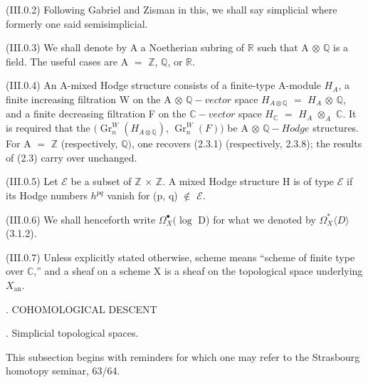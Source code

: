 \documentclass[11pt,twoside]{article}
\begin{document}
(III.0.2) Following Gabriel and Zisman in this, we shall say simplicial where formerly one said semisimplicial.\par
\par\medskip
(III.0.3) We shall denote by A a Noetherian subring of \(\mathbb{R}\) such that A \(\otimes \) \(\mathbb{Q}\) is a field. The useful cases are A \(=\) \(\mathbb{Z}\), \(\mathbb{Q}\), or \(\mathbb{R}\).\par
\par\medskip
(III.0.4) An A-mixed Hodge structure consists of a finite-type A-module \(H_{A}\), a finite increasing filtration W on the A \(\otimes \) \(\mathbb{Q}-vector\) space \(H_{A\otimes \mathbb{Q}}\) \(=\) \(H_{A}\) \(\otimes \) \(\mathbb{Q}\), and a finite decreasing filtration F on the \(\mathbb{C}-vector\) space \(H_{\mathbb{C}}\) \(=\) \(H_{A}\) \(\otimes _{A}\) \(\mathbb{C}\). It is required that the \((\operatorname{Gr}_{n}^{W}(H_{A\otimes \mathbb{Q}})\), \(\operatorname{Gr}_{n}^{W}(F))\) be A \(\otimes \) \(\mathbb{Q}-Hodge\) structures. For A \(=\) \(\mathbb{Z}\) (respectively, \(\mathbb{Q})\), one recovers (2.3.1) (respectively, 2.3.8); the results of (2.3) carry over unchanged.\par
\par\medskip
(III.0.5) Let \(\mathcal{E}\) be a subset of \(\mathbb{Z}\) \(\times \) \(\mathbb{Z}\). A mixed Hodge structure H is of type \(\mathcal{E}\) if its Hodge numbers \(h^{pq}\) vanish for (p, q) \(\notin \) \(\mathcal{E}\).\par
\par\medskip
(III.0.6) We shall henceforth write \(\Omega _{X}^{\bullet }(\operatorname{log}\) D) for what we denoted by \(\Omega _{X}^{\ast }⟨D⟩\) (3.1.2).\par
\par\medskip
(III.0.7) Unless explicitly stated otherwise, scheme means “scheme of finite type over \(\mathbb{C}\),” and a sheaf on a scheme X is a sheaf on the topological space underlying \(X_{\mathrm{an}}\).\par
\par{}. COHOMOLOGICAL DESCENT\par
\par{}. Simplicial topological spaces.\par
\par\medskip
This subsection begins with reminders for which one may refer to the Strasbourg homotopy seminar, 63/64.\par
\par\medskip
\end{document}
